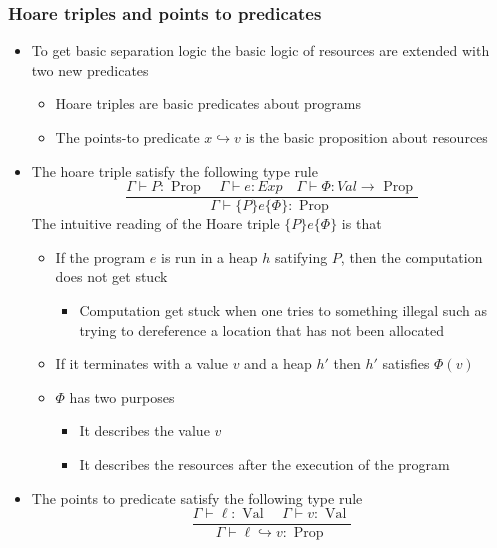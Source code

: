 \subsubsection{Hoare triples and points to predicates}
\begin{itemize}
	\item To get basic separation logic the basic logic of resources are extended with two new predicates
  \begin{itemize}
    \item Hoare triples are basic predicates about programs
    \item The points-to predicate $x \hookrightarrow v$ is the basic proposition about resources
  \end{itemize}
  \item The hoare triple satisfy the following type rule
  \begin{equation*}
  \frac{\Gamma \vdash P: \text { Prop } \quad \Gamma \vdash e: E x p \quad \Gamma \vdash \Phi: V a l \rightarrow \text { Prop }}{\Gamma \vdash \{P\} e\{\Phi\}: \text { Prop }}
  \end{equation*}
  The intuitive reading of the Hoare triple $\{P\} e\{\Phi\}$ is that
  \begin{itemize}
  	\item If the program $e$ is run in a heap $h$ satifying $P$, then the computation does not get stuck
    \begin{itemize}
    	\item Computation get stuck when one tries to something illegal such as trying to dereference a location that has not been allocated
    \end{itemize}
  	\item If it terminates with a value $v$ and a heap $h'$ then $h'$ satisfies $\Phi(v)$
  	\item $\Phi$ has two purposes
    \begin{itemize}
  		\item It describes the value $v$
  		\item It describes the resources after the execution of the program
    \end{itemize}
  \end{itemize}
  \item The points to predicate satisfy the following type rule
  \begin{equation*}
    \frac{\Gamma \vdash \ell: \text { Val } \quad \Gamma \vdash v: \text { Val }}{\Gamma \vdash \ell \hookrightarrow v: \text { Prop }}
  \end{equation*}

\end{itemize}
